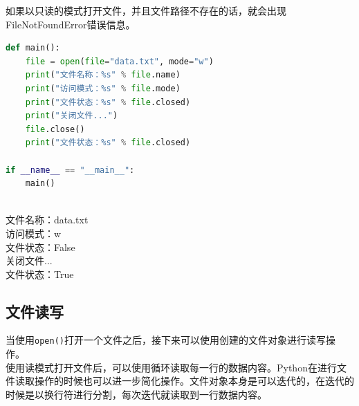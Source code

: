 如果以只读的模式打开文件，并且文件路径不存在的话，就会出现FileNotFoundError错误信息。 \\

\begin{lstlisting}[language=Python]
def main():
    file = open(file="data.txt", mode="w")
    print("文件名称：%s" % file.name)
    print("访问模式：%s" % file.mode)
    print("文件状态：%s" % file.closed)
    print("关闭文件...")
    file.close()
    print("文件状态：%s" % file.closed)

if __name__ == "__main__":
    main()
\end{lstlisting}

\begin{tcolorbox}
	 \\
	文件名称：data.txt \\
	访问模式：w \\
	文件状态：False \\
	关闭文件... \\
	文件状态：True
\end{tcolorbox}

\subsection{文件读写}

当使用\lstinline|open()|打开一个文件之后，接下来可以使用创建的文件对象进行读写操作。 \\

使用读模式打开文件后，可以使用循环读取每一行的数据内容。Python在进行文件读取操作的时候也可以进一步简化操作。文件对象本身是可以迭代的，在迭代的时候是以换行符进行分割，每次迭代就读取到一行数据内容。

